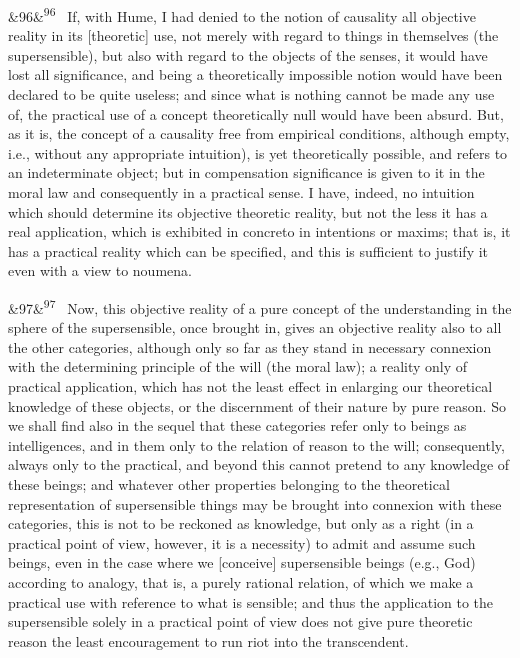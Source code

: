 \documentclass[12pt]{article}
\newcommand{\para}[1][]{\par\noindent\ifx&#1&\else\textsuperscript{\footnotesize #1}~\fi}
\begin{document}
\para[96] If, with Hume, I had denied to the notion of causality all objective reality in its [theoretic] use, not merely with regard to things in themselves (the supersensible), but also with regard to the objects of the senses, it would have lost all significance, and being a theoretically impossible notion would have been declared to be quite useless; and since what is nothing cannot be made any use of, the practical use of a concept theoretically null would have been absurd. But, as it is, the concept of a causality free from empirical conditions, although empty, i.e., without any appropriate intuition), is yet theoretically possible, and refers to an indeterminate object; but in compensation significance is given to it in the moral law and consequently in a practical sense. I have, indeed, no intuition which should determine its objective theoretic reality, but not the less it has a real application, which is exhibited in concreto in intentions or maxims; that is, it has a practical reality which can be specified, and this is sufficient to justify it even with a view to noumena.

\para[97] Now, this objective reality of a pure concept of the understanding in the sphere of the supersensible, once brought in, gives an objective reality also to all the other categories, although only so far as they stand in necessary connexion with the determining principle of the will (the moral law); a reality only of practical application, which has not the least effect in enlarging our theoretical knowledge of these objects, or the discernment of their nature by pure reason. So we shall find also in the sequel that these categories refer only to beings as intelligences, and in them only to the relation of reason to the will; consequently, always only to the practical, and beyond this cannot pretend to any knowledge of these beings; and whatever other properties belonging to the theoretical representation of supersensible things may be brought into connexion with these categories, this is not to be reckoned as knowledge, but only as a right (in a practical point of view, however, it is a necessity) to admit and assume such beings, even in the case where we [conceive] supersensible beings (e.g., God) according to analogy, that is, a purely rational relation, of which we make a practical use with reference to what is sensible; and thus the application to the supersensible solely in a practical point of view does not give pure theoretic reason the least encouragement to run riot into the transcendent.
\end{document}
